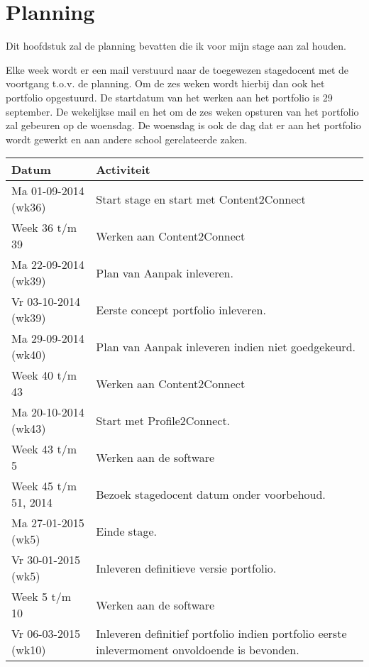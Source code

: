 \section{Planning}
Dit hoofdstuk zal de planning bevatten die ik voor mijn stage aan zal houden.

Elke week wordt er een mail verstuurd naar de toegewezen stagedocent met de voortgang t.o.v. de planning. Om de zes weken wordt hierbij dan ook het portfolio opgestuurd. De startdatum van het werken aan het portfolio is 29 september. De wekelijkse mail en het om de zes weken opsturen van het portfolio zal gebeuren op de woensdag. De woensdag is ook de dag dat er aan het portfolio wordt gewerkt en aan andere school gerelateerde zaken.

\begin{tabu} to \textwidth { | X[l] | X[l] | }
\hline
Datum & Activiteit \\ 
\hline
Ma 01-09-2014 (wk36) & Start stage en start met Content2Connect \\
\hline
Week 36 t/m 39 & Werken aan Content2Connect \\
\hline
Ma 22-09-2014 (wk39) & Plan van Aanpak inleveren. \\
\hline
Vr 03-10-2014 (wk39) & Eerste concept portfolio inleveren. \\
\hline
Ma 29-09-2014 (wk40) & Plan van Aanpak inleveren indien niet goedgekeurd. \\
\hline
Week 40 t/m 43 & Werken aan Content2Connect \\
\hline
Ma 20-10-2014 (wk43) & Start met Profile2Connect. \\
\hline
Week 43 t/m 5 & Werken aan de software \\
\hline
Week 45 t/m 51, 2014 & Bezoek stagedocent datum onder voorbehoud. \\
\hline
Ma 27-01-2015 (wk5) & Einde stage. \\
\hline
Vr 30-01-2015 (wk5) & Inleveren definitieve versie portfolio. \\
\hline
Week 5 t/m 10 & Werken aan de software \\
\hline
Vr 06-03-2015 (wk10) & Inleveren definitief portfolio indien portfolio eerste inlevermoment onvoldoende is bevonden. \\
\hline
\end{tabu}


